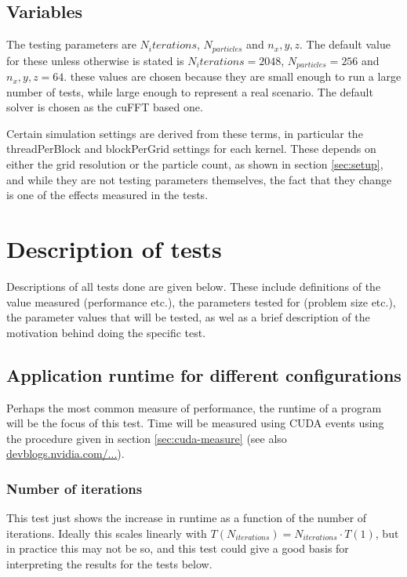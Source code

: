 \subsection{Variables}
The testing parameters are $N_iterations$, $N_{particles}$ and $n_x,y,z$. The default value for these unless otherwise
is stated is $N_iterations = 2048$, $N_{particles} = 256$ and $n_x,y,z = 64$. these values are chosen because they are
small enough to run a large number of tests, while large enough to  represent a real scenario.
The default solver is chosen as the cuFFT based one.


Certain simulation settings are derived from these terms, in particular the threadPerBlock and blockPerGrid settings for
each kernel. These depends on either the grid resolution or the particle count, as shown in section \ref{sec:setup}, and
while they are not testing parameters themselves, the fact that they change is one of the effects measured in the tests.

\section{Description of tests}
Descriptions of all tests done are given below. These include definitions of the value measured (performance etc.), the
parameters tested for (problem size etc.), the parameter values that will be tested, as wel as a brief description of
the motivation behind doing the specific test.
\subsection{Application runtime for different configurations}
Perhaps the most common measure of performance, the runtime of a program will be the focus of this test. Time will be
measured using CUDA events using the procedure given in section \ref{sec:cuda-measure} (see also
 \href{http://devblogs.nvidia.com/parallelforall/how-implement-performance-metrics-cuda-cc/}{devblogs.nvidia.com/...}).

\subsubsection{Number of iterations}
This test just shows the increase in runtime as a function of the number of iterations. Ideally this scales linearly
with $T(N_{iterations}) = N_{iterations}\cdot T(1)$, but in practice this may not be so, and this test could give a good
basis for interpreting the results for the tests below.

